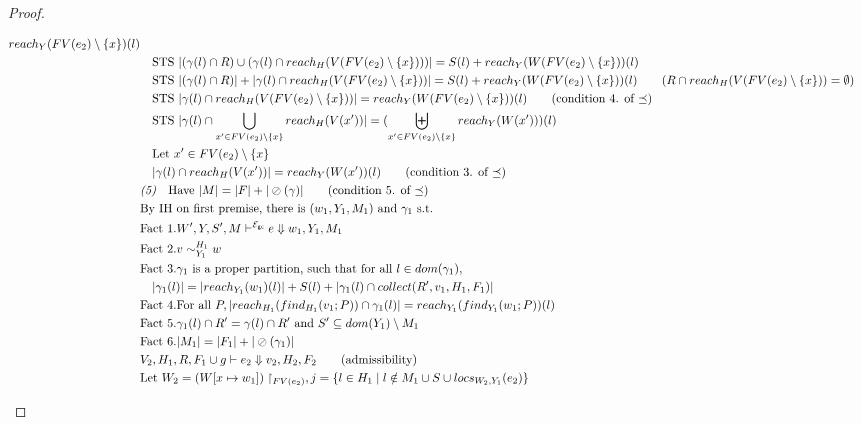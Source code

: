 \documentclass[11pt]{article}
\newcommand{\ms}[1]{\ensuremath{\mathsf{#1}}}
\newcommand{\veq}[4]{#3 \sim^{#1}_{#2} #4}
\newcommand{\oh}[1]{\oslash(#1)}
\newcommand{\gcSem}{\ensuremath{\mathcal{E}_{\ms{gc}}}}
\theoremstyle{definition}
\begin{document}
\begin{proof}
\begin{description}
\begin{align*}
			reach_Y(FV(e_2) \setminus \{x\})(l)\\
		&\quad \text{STS } |(\gamma(l) \cap R) \cup (\gamma(l) \cap 
			reach_H(V(FV(e_2) \setminus \{x\})))| 
			= S(l) + reach_Y(W(FV(e_2) \setminus \{x\}))(l)\\
		&\quad \text{STS } |(\gamma(l) \cap R)| + |\gamma(l) \cap reach_H(V(FV(e_2) \setminus \{x\}))| 
			= S(l) + reach_Y(W(FV(e_2) \setminus \{x\}))(l) 
			\tag{$R \cap reach_H(V(FV(e_2) \setminus \{x\})) = \emptyset$}\\
		&\quad \text{STS } |\gamma(l) \cap reach_H(V(FV(e_2) \setminus \{x\}))| 
			= reach_Y(W(FV(e_2) \setminus \{x\}))(l) \tag{condition 4. of $\preceq$}\\
		&\quad \text{STS } |\gamma(l) \cap \bigcup_{x' \in FV(e_2) \setminus \{x\}} reach_H(V(x'))|
			= (\biguplus_{x' \in FV(e_2) \setminus \{x\}} reach_Y(W(x')))(l)\\
		&\quad \text{Let } x' \in FV(e_2) \setminus \{x\}\\
		&\quad |\gamma(l) \cap reach_H(V(x'))| = reach_Y(W(x'))(l) \tag{condition 3. of $\preceq$}\\
		&\emph{(5)}\quad \text{Have } |M| = |F| + |\oh{\gamma}| \tag{condition 5. of $\preceq$}\\
		&\text{By IH on first premise, there is } (w_1,Y_1,M_1) \text{ and } \gamma_1 \text{ s.t. }\\
		&\text{Fact 1}. W',Y,S',M \vdash^{\gcSem} e \Downarrow w_1,Y_1,M_1\\
		&\text{Fact 2}. \veq{H_1}{Y_1}{v}{w}\\
		&\text{Fact 3}. \gamma_1 \text{ is a proper partition, such that for all } l \in dom(\gamma_1),\\
		&\quad|\gamma_1(l)| = |reach_{Y_1}(w_1)(l)| + S(l) + |\gamma_1(l) \cap collect(R',v_1,H_1,F_1)|\\
		&\text{Fact 4}. \text{For all } P, |reach_{H_1}(find_{H_1}(v_1;P)) \cap \gamma_1(l)| = 
				reach_{Y_1}(find_{Y_1}(w_1;P))(l)\\
		&\text{Fact 5}. \gamma_1(l) \cap R' = \gamma(l) \cap R' \text{ and } 
			S' \subseteq dom(Y_1) \setminus M_1\\
		&\text{Fact 6}. |M_1| = |F_1| + |\oh{\gamma_1}|\\
		&V_2,H_1,R, F_1 \cup g \vdash e_2 \Downarrow v_2,H_2,F_2 \tag{admissibility}\\
		&\text{Let } W_2 = (W[x \mapsto w_1])\restriction_{FV(e_2)}, 
			j = \{ l \in H_1 \mid l \notin M_1 \cup S \cup locs_{W_2,Y_1}(e_2) \}\\

\end{align*}
\end{description}
\end{proof}
\end{document}
